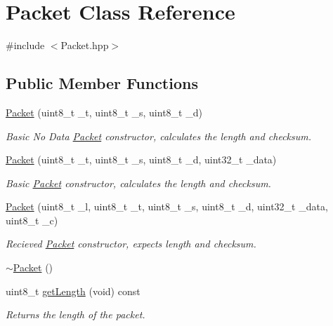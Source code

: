 \hypertarget{class_packet}{}\section{Packet Class Reference}
\label{class_packet}


{\ttfamily \#include $<$Packet.\+hpp$>$}

\subsection*{Public Member Functions}
\begin{DoxyCompactItemize}
\item 
\hyperlink{class_packet_aa1a4657a9d8d09e70c186e03c3901251}{Packet} (uint8\+\_\+t \+\_\+t, uint8\+\_\+t \+\_\+s, uint8\+\_\+t \+\_\+d)
\begin{DoxyCompactList}\small\item\em Basic No Data \hyperlink{class_packet}{Packet} constructor, calculates the length and checksum. \end{DoxyCompactList}\item 
\hyperlink{class_packet_a87e10ec869f6708d43fa808f098926d9}{Packet} (uint8\+\_\+t \+\_\+t, uint8\+\_\+t \+\_\+s, uint8\+\_\+t \+\_\+d, uint32\+\_\+t \+\_\+data)
\begin{DoxyCompactList}\small\item\em Basic \hyperlink{class_packet}{Packet} constructor, calculates the length and checksum. \end{DoxyCompactList}\item 
\hyperlink{class_packet_a21fe118d2899a0f4109eeb10f4da0f72}{Packet} (uint8\+\_\+t \+\_\+l, uint8\+\_\+t \+\_\+t, uint8\+\_\+t \+\_\+s, uint8\+\_\+t \+\_\+d, uint32\+\_\+t \+\_\+data, uint8\+\_\+t \+\_\+c)
\begin{DoxyCompactList}\small\item\em Recieved \hyperlink{class_packet}{Packet} constructor, expects length and checksum. \end{DoxyCompactList}\item 
\hyperlink{class_packet_a48938391fb7e07460bb0e01198ae5ede}{$\sim$\+Packet} ()
\item 
uint8\+\_\+t \hyperlink{class_packet_ac267547cf152cec25d0db301e5286aa7}{get\+Length} (void) const
\begin{DoxyCompactList}\small\item\em Returns the length of the packet. \end{DoxyCompactList}\item 

\end{DoxyCompactItemize}
